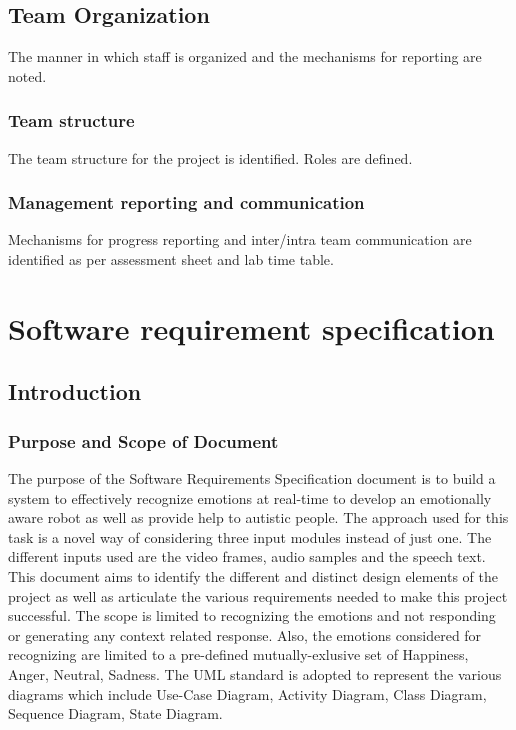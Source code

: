 \documentclass[oneside,a4paper,12pt]{report}
\begin{document}
\begin{normalsize}
 
\section{Team Organization}
The manner in which staff is organized and the mechanisms for reporting are noted.  
\subsection{Team structure}
The team structure for the project is identified. Roles are defined.

\subsection{Management reporting and communication}
Mechanisms for progress reporting and inter/intra team communication are identified as per assessment sheet and lab time table.
 
\chapter{Software requirement specification  }

\section{Introduction}
\subsection{Purpose and Scope of Document}
\hspace{15mm}The purpose of the Software Requirements Specification document is to build a system to effectively recognize emotions at real-time to develop an emotionally aware robot as well as provide help to autistic people. The approach used for this task is a novel way of considering three input modules instead of just one. The different inputs used are the video frames, audio samples and the speech text. This document aims to identify the different and distinct design elements of the project as well as articulate the various requirements needed to make this project successful. The scope is limited to recognizing the emotions and not responding or generating any context related response. Also, the emotions considered for recognizing are limited to a pre-defined mutually-exlusive set of {Happiness, Anger, Neutral, Sadness}. The UML standard is adopted to represent the various diagrams which include Use-Case Diagram, Activity Diagram, Class Diagram, Sequence Diagram, State Diagram.
\newpage

\end{normalsize}
\end{document}

